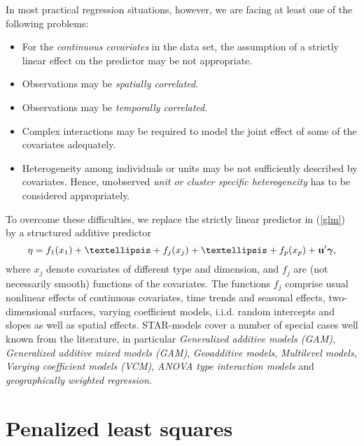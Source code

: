 \documentclass[11pt,a4paper,twoside]{bayesxarticle}
\begin{document}
In most practical regression situations, however, we are facing at
least one of the following problems:
\begin{itemize}
\item For the {\em continuous covariates} in the data set, the assumption of a strictly linear
effect on the predictor may be not appropriate. \vspace{-0.2cm}
\item Observations may be {\em spatially correlated}.
\vspace{-0.2cm}
\item Observations may be {\em temporally correlated}.
\vspace{-0.2cm}
\item Complex interactions may be required to model the joint effect
of some of the covariates adequately. \vspace{-0.2cm}
\item  Heterogeneity among individuals or units may be not sufficiently described by covariates. Hence,
unobserved {\em unit or cluster specific heterogeneity} has to be
considered appropriately.
\end{itemize}
To overcome these difficulties, we replace the strictly linear
predictor in (\ref{glm}) by a structured additive predictor
\begin{equation}
\label{gampred} \eta=f_{1}(x_{1})+\ldots+f_j(x_j) +
\ldots+f_{p}(x_{p})+\uvec'\gammavec,
\end{equation}
where $x_j$ denote
covariates of different type and dimension, and $f_j$ are (not
necessarily smooth) functions of the covariates. The functions $f_j$
comprise usual nonlinear effects of continuous covariates, time
trends and seasonal effects, two-dimensional surfaces, varying
coefficient models, i.i.d. random intercepts and slopes as well as
spatial effects. STAR-models cover a number of special cases
well known from the literature, in particular {\em Generalized additive models (GAM)},
{\em Generalized additive mixed models (GAM)}, {\em Geoadditive models}, {\em Multilevel models},
{\em Varying coefficient models (VCM)}, {\em ANOVA type interaction models} and {\em geographically weighted regression}.

\section{Penalized least squares}
\label{penalizedleastsquares}
\end{document}
